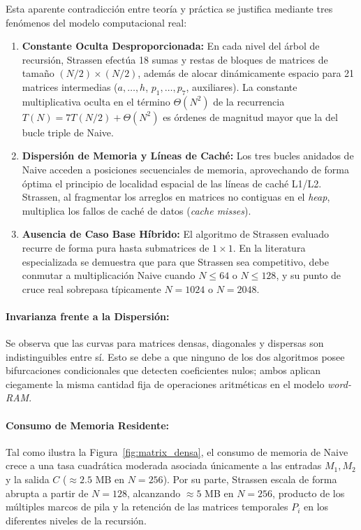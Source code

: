 Esta aparente contradicción entre teoría y práctica se justifica mediante tres fenómenos del modelo computacional real:
\begin{enumerate}
    \item \textbf{Constante Oculta Desproporcionada:} En cada nivel del árbol de recursión, Strassen efectúa 18 sumas y restas de bloques de matrices de tamaño $(N/2) \times (N/2)$, además de alocar dinámicamente espacio para 21 matrices intermedias ($a, \dots, h$, $p_1, \dots, p_7$, auxiliares). La constante multiplicativa oculta en el término $\Theta(N^2)$ de la recurrencia $T(N) = 7T(N/2) + \Theta(N^2)$ es órdenes de magnitud mayor que la del bucle triple de Naive.
    \item \textbf{Dispersión de Memoria y Líneas de Caché:} Los tres bucles anidados de Naive acceden a posiciones secuenciales de memoria, aprovechando de forma óptima el principio de localidad espacial de las líneas de caché L1/L2. Strassen, al fragmentar los arreglos en matrices no contiguas en el \textit{heap}, multiplica los fallos de caché de datos (\textit{cache misses}).
    \item \textbf{Ausencia de Caso Base Híbrido:} El algoritmo de Strassen evaluado recurre de forma pura hasta submatrices de $1 \times 1$. En la literatura especializada se demuestra que para que Strassen sea competitivo, debe conmutar a multiplicación Naive cuando $N \le 64$ o $N \le 128$, y su punto de cruce real sobrepasa típicamente $N = 1024$ o $N = 2048$.
\end{enumerate}

\paragraph{Invarianza frente a la Dispersión:}
Se observa que las curvas para matrices densas, diagonales y dispersas son indistinguibles entre sí. Esto se debe a que ninguno de los dos algoritmos posee bifurcaciones condicionales que detecten coeficientes nulos; ambos aplican ciegamente la misma cantidad fija de operaciones aritméticas en el modelo \textit{word-RAM}.

\paragraph{Consumo de Memoria Residente:}
Tal como ilustra la Figura~\ref{fig:matrix_densa}, el consumo de memoria de Naive crece a una tasa cuadrática moderada asociada únicamente a las entradas $M_1, M_2$ y la salida $C$ ($\approx 2.5$ MB en $N=256$). Por su parte, Strassen escala de forma abrupta a partir de $N = 128$, alcanzando $\approx 5$ MB en $N=256$, producto de los múltiples marcos de pila y la retención de las matrices temporales $P_i$ en los diferentes niveles de la recursión.